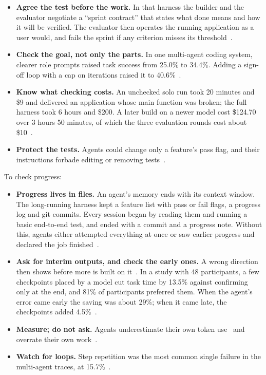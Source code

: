 \documentclass[11pt,letterpaper]{article}
\begin{document}
\begin{itemize}
  \item \textbf{Agree the test before the work.} In that harness the builder and the evaluator
        negotiate a ``sprint contract'' that states what done means and how it will be
        verified. The evaluator then operates the running application as a user would, and
        fails the sprint if any criterion misses its threshold~\cite{harness}.
  \item \textbf{Check the goal, not only the parts.} In one multi-agent coding system, clearer
        role prompts raised task success from 25.0\% to 34.4\%. Adding a sign-off loop with a
        cap on iterations raised it to 40.6\%~\cite{mast}.
  \item \textbf{Know what checking costs.} An unchecked solo run took 20 minutes and \$9 and
        delivered an application whose main function was broken; the full harness took 6 hours
        and \$200. A later build on a newer model cost \$124.70 over 3 hours 50 minutes, of
        which the three evaluation rounds cost about \$10~\cite{harness}.
  \item \textbf{Protect the tests.} Agents could change only a feature's pass flag, and their
        instructions forbade editing or removing tests~\cite{longrun}.
\end{itemize}

To check progress:

\begin{itemize}
  \item \textbf{Progress lives in files.} An agent's memory ends with its context window. The
        long-running harness kept a feature list with pass or fail flags, a progress log and
        git commits. Every session began by reading them and running a basic end-to-end test,
        and ended with a commit and a progress note. Without this, agents either attempted
        everything at once or saw earlier progress and declared the job
        finished~\cite{longrun}.
  \item \textbf{Ask for interim outputs, and check the early ones.} A wrong direction then
        shows before more is built on it~\cite{mollick}. In a study with 48 participants, a
        few checkpoints placed by a model cut task time by 13.5\% against confirming only at
        the end, and 81\% of participants preferred them. When the agent's error came early
        the saving was about 29\%; when it came late, the checkpoints added
        4.5\%~\cite{zhou}.
  \item \textbf{Measure; do not ask.} Agents underestimate their own token use~\cite{bai} and
        overrate their own work~\cite{harness}.
  \item \textbf{Watch for loops.} Step repetition was the most common single failure in the
        multi-agent traces, at 15.7\%~\cite{mast}.
\end{itemize}
\end{document}
